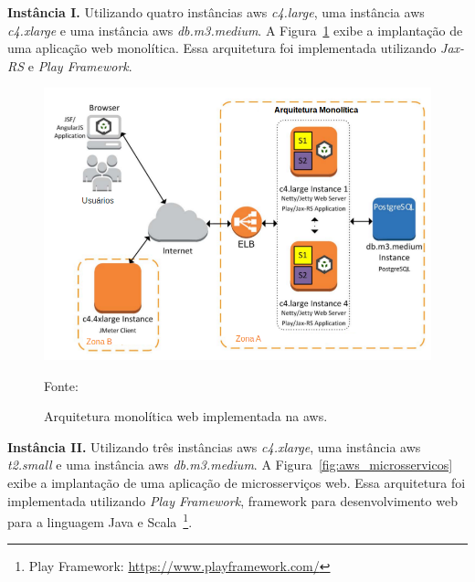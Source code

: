 \textbf{Instância I.} Utilizando quatro instâncias \ac{aws} \textit{c4.large}, uma instância \ac{aws} \textit{c4.xlarge} e uma instância \ac{aws} \textit{db.m3.medium}.
%
A Figura~\ref{fig:aws_monolitico} exibe a implantação de uma aplicação web monolítica.
%
Essa arquitetura foi implementada utilizando \textit{Jax-RS} e \textit{Play Framework}.


\begin{figure}[htb!]
\caption{Arquitetura monolítica web implementada na \ac{aws}.}
\vspace{-0.5cm}
\label{fig:aws_monolitico}
\includegraphics[width=.8\textwidth]{img/cap2/aws_monolitico.png}
\centering

Fonte:~\cite{7515686}
\end{figure}




\textbf{Instância II.} Utilizando três instâncias \ac{aws} \textit{c4.xlarge}, uma instância \ac{aws} \textit{t2.small} e uma instância \ac{aws} \textit{db.m3.medium}.
%
A Figura~\ref{fig:aws_microsservicos} exibe a implantação de uma aplicação de microsserviços web. Essa arquitetura foi implementada utilizando \textit{Play Framework}, framework para desenvolvimento web para a linguagem Java e Scala~\footnote{Play Framework: \url{https://www.playframework.com/}}.

